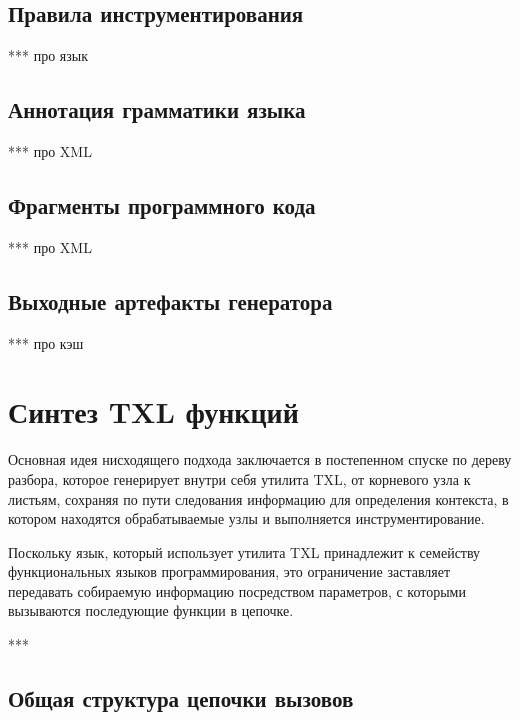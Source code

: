 \subsection{Правила инструментирования}

***
про язык

\subsection{Аннотация грамматики языка}

***
про XML

\subsection{Фрагменты программного кода}

***
про XML

\subsection{Выходные артефакты генератора}

***
про кэш

\section{Синтез TXL функций}

Основная идея нисходящего подхода заключается в постепенном спуске по дереву разбора, которое генерирует внутри себя утилита TXL, от корневого узла к листьям, сохраняя по пути следования информацию для определения контекста, в котором находятся обрабатываемые узлы и выполняется инструментирование.

Поскольку язык, который использует утилита TXL принадлежит к семейству функциональных языков программирования, это ограничение заставляет передавать собираемую информацию посредством параметров, с которыми вызываются последующие функции в цепочке.

***

\subsection{Общая структура цепочки вызовов}

